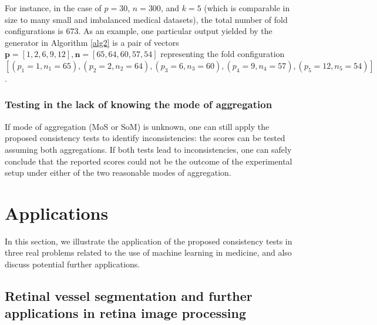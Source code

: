 \documentclass[5p, final]{elsarticle}
\begin{document}
For instance, in the case of $p=30$, $n=300$, and $k=5$ (which is comparable in size to many small and imbalanced medical datasets), the total number of fold configurations is $673$. As an example, one particular output yielded by the generator in Algorithm \ref{alg2} is a pair of vectors $\mathbf{p}=[1, 2, 6, 9, 12], \mathbf{n} = [65, 64, 60, 57, 54]$ representing the fold configuration $[(p_1=1, n_1=65), (p_2=2, n_2=64), (p_3=6, n_3=60), (p_4=9, n_4=57), (p_5=12, n_5=54)]$.

\subsubsection{Testing in the lack of knowing the mode of aggregation}
\label{sec:lackagg}

If mode of aggregation (MoS or SoM) is unknown, one can still apply the proposed consistency tests to identify inconsistencies: the scores can be tested assuming both aggregations. If both tests lead to inconsistencies, one can safely conclude that the reported scores could not be the outcome of the experimental setup under either of the two reasonable modes of aggregation.

\section{Applications}
\label{sec:applications}

In this section, we illustrate the application of the proposed consistency tests in three real problems related to the use of machine learning in medicine, and also discuss potential further applications.

\subsection{Retinal vessel segmentation and further applications in retina image processing}
\label{sec:retina}
\end{document}
